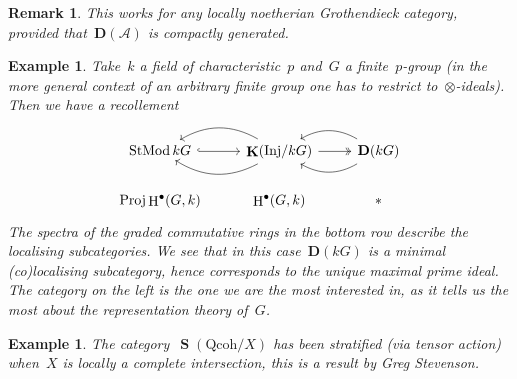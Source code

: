 \documentclass[10pt,a4paper]{article}
\theoremstyle{lecture}
\newtheorem{example}[theorem]{Example}
\newtheorem{remark}[theorem]{Remark}
\newcommand\dash{\nobreakdash-\hspace{0pt}}
\newcommand\derived{\ensuremath{\mathbf{D}}}
\newcommand\Inj{\ensuremath{\mathrm{Inj}}}
\newcommand\Qcoh{\ensuremath{\mathrm{Qcoh}}}
\DeclareMathOperator\HH{H}
\DeclareMathOperator\KKK{\mathbf{K}}
\DeclareMathOperator\Proj{Proj}
\DeclareMathOperator\SSing{\mathbf{S}}
\DeclareMathOperator\StMod{StMod}
\begin{document}
\begin{remark}
  This works for any locally noetherian Grothendieck category, provided that~$\derived(\mathcal{A})$ is compactly generated.
\end{remark}

\begin{example}
  Take~$k$ a field of characteristic~$p$ and~$G$ a finite~$p$\dash group (in the more general context of an arbitrary finite group one has to restrict to~$\otimes$\dash ideals). Then we have a recollement
  \begin{equation}
    \begin{tikzcd}
      \StMod kG \arrow[hook]{r} & \KKK(\Inj/kG) \arrow[bend right, swap]{l} \arrow[bend left]{l} \arrow[two heads]{r} & \derived(kG) \arrow[bend right, swap]{l} \arrow[bend left]{l} \\
      \Proj\HH^\bullet(G,k) & \HH^\bullet(G,k) & *
    \end{tikzcd}
  \end{equation}
  The spectra of the graded commutative rings in the bottom row describe the localising subcategories. We see that in this case~$\derived(kG)$ is a minimal (co)localising subcategory, hence corresponds to the unique maximal prime ideal. The category on the left is the one we are the most interested in, as it tells us the most about the representation theory of~$G$.
\end{example}

\begin{example}
  The category~$\SSing(\Qcoh/X)$ has been stratified (via tensor action) when~$X$ is locally a complete intersection, this is a result by Greg Stevenson.
\end{example}
\end{document}
